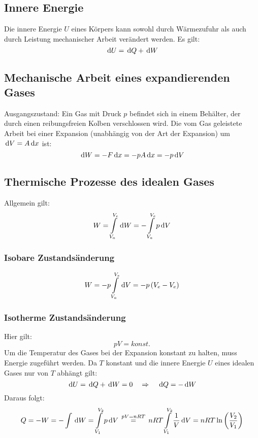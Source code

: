 \subsection{Innere Energie}
Die innere Energie $U$ eines Körpers kann sowohl durch Wärmezufuhr als auch durch Leistung mechanischer Arbeit verändert werden. Es gilt:
\begin{equation}
\,\mathrm{d} U = \,\mathrm{d} Q + \,\mathrm{d} W
\end{equation}
\subsection{Mechanische Arbeit eines expandierenden Gases}
Ausgangszustand: Ein Gas mit Druck $p$ befindet sich in einem Behälter, der durch einen reibungsfreien Kolben verschlossen wird. Die vom Gas geleistete Arbeit bei einer Expansion (unabhängig von der Art der Expansion) um $\,\mathrm{d} V = A \,\mathrm{d} x$ ist:
\begin{equation}
\,\mathrm{d} W = -F \,\mathrm{d} x = - p A  \,\mathrm{d} x = - p \,\mathrm{d} V
\end{equation}
\subsection{Thermische Prozesse des idealen Gases}
Allgemein gilt:
\begin{equation}
W = \int\limits_{V_a}^{V_e} \,\mathrm{d} W = - \int\limits_{V_a}^{V_e}p \,\mathrm{d} V
\end{equation}
\subsubsection{Isobare Zustandsänderung}
\begin{equation}
W = - p \int\limits_{V_a}^{V_e} \,\mathrm{d} V = -p \left( V_e - V_e \right)
\end{equation}
\subsubsection{Isotherme Zustandsänderung}
Hier gilt: $$pV = konst.$$
Um die Temperatur des Gases bei der Expansion konstant zu halten, muss Energie zugeführt werden. Da $T$ konstant und die innere Energie $U$ eines idealen Gases nur von $T$ abhängt gilt:
\begin{equation}
\,\mathrm{d} U = \,\mathrm{d} Q + \,\mathrm{d} W = 0 \quad\Rightarrow\quad \,\mathrm{d} Q = - \,\mathrm{d} W
\end{equation}
Daraus folgt:
\begin{equation}
Q = - W = - \int\,\mathrm{d} W = \int\limits_{V_1}^{V_2}p \,\mathrm{d} V \,\overset{pV=nRT}{=}\, nRT \int\limits_{V_1}^{V_2}\frac{1}{V} \,\mathrm{d} V = nRT \ln\left(\frac{V_2}{V_1} \right)
\end{equation}
